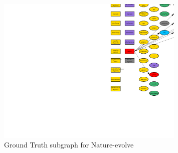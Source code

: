 \documentclass{article}%
\begin{document}
\begin{figure}[ht]%
\centering%
\includegraphics[width=0.8\textwidth]{images/Nature-evolve.png}%
\caption{Ground Truth subgraph for Nature{-}evolve}%
\end{figure}

%
\end{document}
